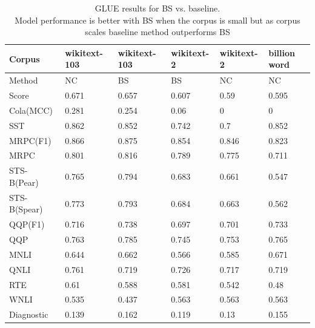 \begin{table}[]
\begin{tabular}{|l|l|l|l|l|l|}
\hline
Corpus       & wikitext-103 & wikitext-103 & wikitext-2 & wikitext-2 & billion word               \\ \hline \hline
Method       & NC           & BS           & BS         & NC         & NC                         \\ \hline
Score        & 0.671        & 0.657        & 0.607      & 0.59       & 0.595                      \\ \hline
Cola(MCC)    & 0.281        & 0.254        & 0.06       & 0          & 0                          \\ \hline
SST          & 0.862        & 0.852        & 0.742      & 0.7        & 0.852                      \\ \hline
MRPC(F1)     & 0.866        & 0.875        & 0.854      & 0.846      & 0.823                      \\ \hline
MRPC         & 0.801        & 0.816        & 0.789      & 0.775      & 0.711                      \\ \hline
STS-B(Pear)  & 0.765        & 0.794        & 0.683      & 0.661      & 0.547                      \\ \hline
STS-B(Spear) & 0.773        & 0.793        & 0.684      & 0.663      & 0.562                      \\ \hline
QQP(F1)      & 0.716        & 0.738        & 0.697      & 0.701      & 0.733                      \\ \hline
QQP          & 0.763        & 0.785        & 0.745      & 0.753      & 0.765                      \\ \hline
MNLI         & 0.644        & 0.662        & 0.566      & 0.585      & 0.671                      \\ \hline
QNLI         & 0.761        & 0.719        & 0.726      & 0.717      & 0.719                      \\ \hline
RTE          & 0.61         & 0.588        & 0.581      & 0.542      & 0.48                       \\ \hline
WNLI         & 0.535        & 0.437        & 0.563      & 0.563      & 0.563                      \\ \hline
Diagnostic   & 0.139        & 0.162        & 0.119      & 0.13       & \multicolumn{1}{l|}{0.155} \\ \hline
\end{tabular}
\caption{GLUE results for BS vs. baseline.\\ Model performance is better with BS when the corpus is small but as corpus scales baseline method outperforms BS}
\label{table:glue-corpus}
\end{table}
